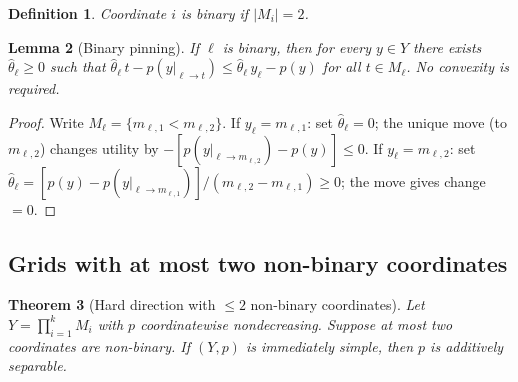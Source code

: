 \documentclass[11pt]{article}
\newtheorem{theorem}{Theorem}[section]
\newtheorem{lemma}[theorem]{Lemma}
\newtheorem{definition}[theorem]{Definition}
\begin{document}
\begin{definition}\label{def:binary}
Coordinate $i$ is \emph{binary} if $|M_i| = 2$.
\end{definition}

\begin{lemma}[Binary pinning]\label{lem:pin-binary}
If $\ell$ is binary, then for every $y \in Y$ there exists
$\hat\theta_\ell \geq 0$ such that
$\hat\theta_\ell\, t - p(y|_{\ell \to t}) \leq
\hat\theta_\ell\, y_\ell - p(y)$ for all $t \in M_\ell$.
No convexity is required.
\end{lemma}

\begin{proof}
Write $M_\ell = \{m_{\ell,1} < m_{\ell,2}\}$.
If $y_\ell = m_{\ell,1}$: set $\hat\theta_\ell = 0$; the unique move
(to $m_{\ell,2}$) changes utility by $-[p(y|_{\ell \to m_{\ell,2}}) - p(y)]
\leq 0$.
If $y_\ell = m_{\ell,2}$: set $\hat\theta_\ell = [p(y) -
p(y|_{\ell \to m_{\ell,1}})] / (m_{\ell,2} - m_{\ell,1}) \geq 0$;
the move gives change $= 0$.
\end{proof}

\subsection{Grids with at most two non-binary coordinates}

\begin{theorem}[Hard direction with $\leq 2$ non-binary coordinates]%
\label{thm:binary}
Let $Y = \prod_{i=1}^k M_i$ with $p$ coordinatewise nondecreasing.
Suppose at most two coordinates are non-binary.  If $(Y, p)$ is
immediately simple, then $p$ is additively separable.
\end{theorem}
\end{document}
